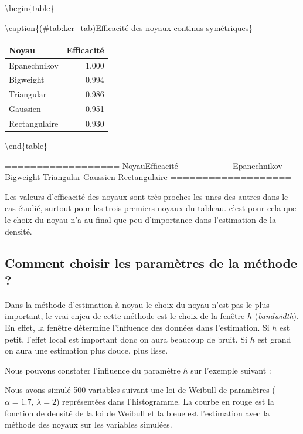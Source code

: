 \documentclass[
]{book}
\theoremstyle{definition}
\theoremstyle{definition}
\theoremstyle{definition}
\theoremstyle{definition}
\theoremstyle{remark}
\begin{document}
\textbackslash begin\{table\}

\textbackslash caption\{(\#tab:ker\_tab)Efficacité des noyaux continus symétriques\}
\centering

\begin{tabular}[t]{l|r}
\hline
Noyau & Efficacité\\
\hline
Epanechnikov & 1.000\\
\hline
Bigweight & 0.994\\
\hline
Triangular & 0.986\\
\hline
Gaussien & 0.951\\
\hline
Rectangulaire & 0.930\\
\hline
\end{tabular}

\textbackslash end\{table\}

==================
Noyau\textbar Efficacité
------------------
Epanechnikov
Bigweight
Triangular
Gaussien
Rectangulaire
===================

\begin{rem}
Les valeurs d'efficacité des noyaux sont très proches les unes des autres dans le cas étudié, surtout pour les trois premiers noyaux du tableau. c'est pour cela que le choix du noyau n'a au final que peu d'importance dans l'estimation de la densité. 
\end{rem}

\hypertarget{comment-choisir-les-paramuxe8tres-de-la-muxe9thode}{%
\subsection{Comment choisir les paramètres de la méthode ?}\label{comment-choisir-les-paramuxe8tres-de-la-muxe9thode}}

Dans la méthode d'estimation à noyau le choix du noyau n'est pas le plus important, le vrai enjeu de cette méthode est le choix de la fenêtre \(h\) (\emph{bandwidth}).
En effet, la fenêtre détermine l'influence des données dans l'estimation. Si \(h\) est petit, l'effet local est important donc on aura beaucoup de bruit. Si \(h\) est grand on aura une estimation plus douce, plus lisse.

Nous pouvons constater l'influence du paramètre \(h\) sur l'exemple suivant :

Nous avons simulé 500 variables suivant une loi de Weibull de paramètres (\(\alpha = 1.7\), \(\lambda=2\)) représentées dans l'histogramme. La courbe en rouge est la fonction de densité de la loi de Weibull et la bleue est l'estimation avec la méthode des noyaux sur les variables simulées.
\end{document}
